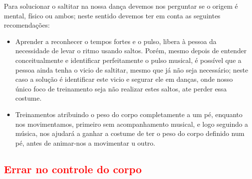 \begin{SolutionT}
Para solucionar o saltitar na nossa dança devemos nos perguntar se o origem é mental, físico ou ambos;
neste sentido devemos ter em conta as seguintes recomendações:
\begin{itemize}
\item  Aprender a reconhecer o tempos fortes e o pulso, 
libera à pessoa da necessidade de levar o ritmo usando saltos.
Porém, mesmo depois de entender conceitualmente e identificar perfeitamente o pulso musical,
é possível que a pessoa ainda tenha o vicio de saltitar, mesmo que já não seja necessário;
neste caso a solução é identificar este vicio e segurar ele em danças, 
onde nosso único foco de treinamento seja não realizar estes saltos, ate perder essa costume.
\item  Treinamentos atribuindo o peso do corpo completamente a um pé, 
enquanto nos movimentamos, primeiro sem acompanhamento musical,
e logo seguindo a música, 
nos ajudará a ganhar a costume de ter o peso do corpo definido num pé,
antes de animar-nos a movimentar u outro. 
\end{itemize}
\end{SolutionT}




\subsection{\textcolor{red}{Errar no controle do corpo}}

